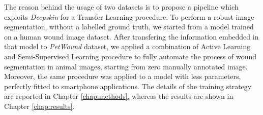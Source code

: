 \documentclass[../main.tex]{subfiles}
\begin{document}
The reason behind the usage of two datasets is to propose a pipeline which exploits \textit{Deepskin} for a Transfer Learning procedure.
To perform a robust image segmentation, without a labelled ground truth, we started from a model trained on a human wound image dataset.
After transfering the information embedded in that model to \textit{PetWound} dataset, we applied a combination of Active Learning and Semi-Supervised Learning procedure to fully automate the process of wound segmentation in animal images, starting from zero manually annotated image.
Moreover, the same procedure was applied to a model with less parameters, perfectly fitted to smartphone applications. 
The details of the training strategy are reported in Chapter \ref{chap:methods}, whereas the results are shown in Chapter \ref{chap:results}.
\end{document}
